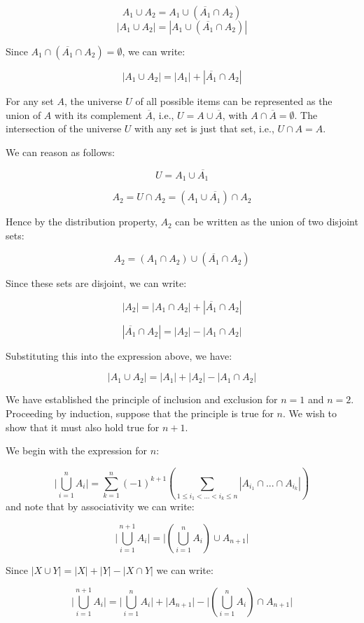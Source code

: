 \documentclass[a4paper,12pt]{article}
\begin{document}
\[ A_1 \cup A_2 = A_1 \cup (\overline{A_1} \cap A_2) \]
\[ |A_1 \cup A_2| =  |A_1 \cup (\overline{A_1} \cap A_2)| \]

Since $A_1 \cap (\overline{A_1} \cap A_2) = \emptyset$, we can write:

\[ |A_1 \cup A_2| = |A_1| + |\overline{A_1} \cap A_2| \]

For any set $A$, the universe $U$ of all possible items can be represented as the union of $A$ with its complement $\overline{A}$, i.e., $U = A \cup \overline{A}$, with $A \cap \overline{A} = \emptyset$. The intersection of the universe $U$ with any set is just that set, i.e., $U \cap A = A$. 

We can reason as follows:

\[ U = A_1 \cup \overline{A_1} \]

\[ A_2 = U \cap A_2 = (A_1 \cup \overline{A_1}) \cap A_2 \]

Hence by the distribution property, $A_2$ can be written as the union of two disjoint sets:

\[ A_2 = (A_1 \cap A_2) \cup (\overline{A_1} \cap A_2) \]

Since these sets are disjoint, we can write:

\[ |A_2| = |A_1 \cap A_2| + |\overline{A_1} \cap A_2| \]

\[ |\overline{A_1} \cap A_2 | = |A_2| - |A_1 \cap A_2| \]

Substituting this into the expression above, we have:

\[ |A_1 \cup A_2| = |A_1| + |A_2| - |A_1 \cap A_2| \]

We have established the principle of inclusion and exclusion for $n=1$ and $n=2$. Proceeding by induction, suppose that the principle is true for $n$. We wish to show that it must also hold true for $n+1$.

We begin with the expression for $n$:

\[ \bigg|\bigcup_{i=1}^n A_i \bigg| = \sum_{k=1}^n(-1)^{k+1}\left(\sum_{1 \le i_1 < ... < i_k \le n} |A_{i_1} \cap ... \cap A_{i_k}|\right) \]
and note that by associativity we can write:

\[ \bigg|\bigcup_{i=1}^{n+1} A_i \bigg| = \bigg| \left(\bigcup_{i=1}^n A_i\right) \cup A_{n+1} \bigg| \]

Since $|X \cup Y| = |X| + |Y| - |X \cap Y|$ we can write:

\[  \bigg|\bigcup_{i=1}^{n+1} A_i \bigg|  = \bigg| \bigcup_{i=1}^n A_i \bigg|  + \bigg|A_{n+1}\bigg| - \bigg| \left(\bigcup_{i=1}^n A_i\right) \cap A_{n+1}  \bigg| \]
\end{document}
